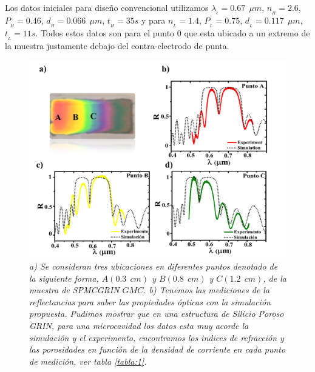 \documentclass[a4paper,11pt,]{book}
\begin{document}
Los datos iniciales para diseño convencional utilizamos $\lambda_{_{c}}= 0.67 \ \ \mu m$, $n_{_{H}} =2.6$, $P_{_{H}} =0.46$, $d_{_{H}}=0.066 \ \ \mu m  $, $t_{_{H}}=35 s  $ y para  $n_{_{L}}= 1.4$,  $P_{_{L}} =0.75$, $d_{_{L}}=0.117 \ \ \mu m  $, $t_{_{L}}=11 s  $. Todos estos datos son para el punto $0$  que esta ubicado a un extremo de la muestra justamente debajo del contra-electrodo de punta. 
\begin{figure}[H]
	\centering
	\includegraphics[scale=.4]{../Images/MCGRIN211}
	\caption{\emph{a) Se consideran tres ubicaciones en diferentes puntos denotado de la siguiente forma,  $A(0.3\ \ cm)$ y $ B(0.8 \ \  cm)$ y $ C(1.2 \ \  cm)$, de la  muestra de SPMCGRIN $GMC$.  b) Tenemos las mediciones de la reflectancias para saber las propiedades ópticas con la simulación propuesta. Pudimos mostrar que en una estructura de Silicio Poroso GRIN, para una microcavidad los datos esta muy acorde la simulación y el experimento, encontramos los indices de refracción y las porosidades en función de la densidad de corriente en cada punto de medición, ver tabla \ref{tabla:1}. }}
	\label{fig:MCGRIN3}
\end{figure}
\end{document}
